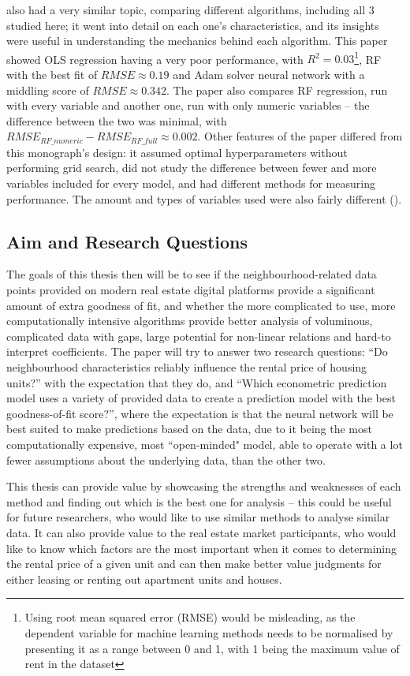 \documentclass[12pt]{report}
\begin{document}
\textcite{neloy2019} also had a very similar topic, comparing different algorithms, including all 3 studied here; it went into detail on each one's characteristics, and its insights were useful in understanding the mechanics behind each algorithm. This paper showed OLS regression having a very poor performance, with $R^2=0.03$\footnote{Using root mean squared error (RMSE) would be misleading, as the dependent variable for machine learning methods needs to be normalised by presenting it as a range between 0 and 1, with 1 being the maximum value of rent in the dataset}, RF with the best fit of $RMSE\approx 0.19$ and Adam solver neural network with a middling score of $RMSE\approx 0.342$. The paper also compares RF regression, run with every variable and another one, run with only numeric variables -- the difference between the two was minimal, with $RMSE_{RF\_numeric}-RMSE_{RF\_full}\approx 0.002$. Other features of the paper differed from this monograph's design: it assumed optimal hyperparameters without performing grid search, did not study the difference between fewer and more variables included for every model, and had different methods for measuring performance. The amount and types of variables used were also fairly different (\cite[p.352]{neloy2019}).

\subsection{Aim and Research Questions}
The goals of this thesis then will be to see if the neighbourhood-related data points provided on modern real estate digital platforms provide a significant amount of extra goodness of fit, and whether the more complicated to use, more computationally intensive algorithms provide better analysis of voluminous, complicated data with gaps, large potential for non-linear relations and hard-to interpret coefficients. The paper will try to answer two research questions: “Do neighbourhood characteristics reliably influence the rental price of housing units?”  with the expectation that they do, and “Which econometric prediction model uses a variety of provided data to create a prediction model with the best goodness-of-fit score?”, where the expectation is that the neural network will be best suited to make predictions based on the data, due to it being the most computationally expensive, most ``open-minded" model, able to operate with a lot fewer assumptions about the underlying data, than the other two.

This thesis can provide value by showcasing the strengths and weaknesses of each method and finding out which is the best one for analysis -- this could be useful for future researchers, who would like to use similar methods to analyse similar data. It can also provide value to the real estate market participants, who would like to know which factors are the most important when it comes to determining the rental price of a given unit and can then make better value judgments for either leasing or renting out apartment units and houses.
\end{document}
